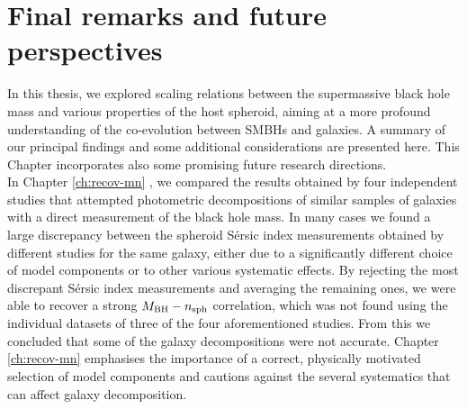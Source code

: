 \chapter{Final remarks and future perspectives}
\label{ch:concl}

In this thesis, we explored scaling relations between the supermassive black hole mass 
and various properties of the host spheroid, 
aiming at a more profound understanding of the co-evolution between SMBHs and galaxies. 
A summary of our principal findings and some additional considerations are presented here. 
This Chapter incorporates also some promising future research directions. \\

In Chapter \ref{ch:recov-mn} \citep{savorgnan2013}, we compared the results obtained by four independent studies 
\citep{grahamdriver2007,sani2011,vika2012,beifiori2012}
that attempted photometric decompositions of similar samples of galaxies with a direct measurement 
of the black hole mass. 
In many cases we found a large discrepancy between the spheroid S\'ersic index measurements 
obtained by different studies for the same galaxy, 
either due to a significantly different choice of model components 
or to other various systematic effects. 
By rejecting the most discrepant S\'ersic index measurements and averaging the remaining ones, 
we were able to recover a strong $M_{\rm BH} - n_{\rm sph}$ correlation, 
which was not found using the individual datasets of three of the four aforementioned studies. 
From this we concluded that some of the galaxy decompositions were not accurate. 
Chapter \ref{ch:recov-mn} emphasises the importance of a correct, physically motivated selection of model components 
and cautions against the several systematics that can affect galaxy decomposition. \\

